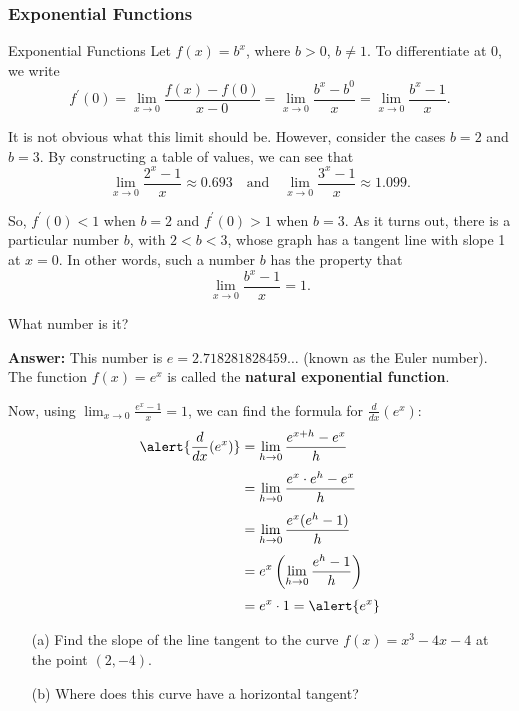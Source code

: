 \documentclass[cal1spr16Lectures.tex]{subfiles}
\begin{document}
\subsubsection{Exponential Functions}

\begin{frame}{\small Exponential Functions}\footnotesize
Let $f(x)=b^x$, where $b>0$, $b \neq 1$.  To differentiate at $0$, we write
\[f^{\prime}(0)=\lim_{x \to 0}\frac{f(x)-f(0)}{x-0}=\lim_{x \to 0} \frac{b^x-b^0}{x}=
\lim_{x \to 0} \frac{b^x-1}{x}.\]

\vspace{1pc}
It is not obvious what this limit should be.  However, consider the cases $b=2$ and $b=3$.  By constructing a table of values, we can see that 
\[\lim_{x \to 0} \frac{2^x-1}{x} \approx 0.693 \quad \text{and}\quad \lim_{x \to 0} \frac{3^x-1}{x} \approx 1.099.\]
\end{frame}

\begin{frame}\footnotesize
So, $f^{\prime}(0)<1$ when $b=2$ and $f^{\prime}(0)>1$ when $b=3$.  As it turns out, there is a particular number $b$, with $2<b<3$, whose graph has a tangent line with slope 1 at $x=0$.  In other words, such a number $b$ has the property that 
\[\lim_{x \to 0} \frac{b^x-1}{x}=1.\]
\begin{que}What number is it? \end{que}
{\bf Answer:} This number is $e=2.718281828459 \dots$ (known as the Euler number).  The function $f(x)=e^x$ is called the \alert{\bf natural exponential function}.
\end{frame}

\begin{frame}\footnotesize
Now, using  $\displaystyle\lim_{x \to 0} \frac{e^x-1}{x}=1$, we can find the formula for $\frac{d}{dx}(e^x)$:
\begin{align*}
\alert{\frac{d}{dx}(e^x)} &= \lim_{h \to 0} \frac{e^{x+h}-e^x}{h} \\[0.25pc]
 &= \lim_{h \to 0}\frac{e^x \cdot e^h -e^x}{h} \\[0.25pc]
 &= \lim_{h\to 0}\frac{e^x(e^h-1)}{h} \\[0.25pc]
 &=e^x \left(\lim_{h \to 0} \frac{e^h-1}{h}\right) \\[0.25pc]
  &= e^x \cdot 1 = \alert{e^x}
\end{align*}
\end{frame}

\begin{frame}{}
\begin{exe} 
	\begin{itemize}
	\item[(a)] Find the slope of the line tangent to the curve $f(x)=x^3-4x-4$ at the point $(2,-4)$. 
	\item[(b)] Where does this curve have a horizontal tangent?
	\end{itemize}
\end{exe}	
\end{frame}
\end{document}
